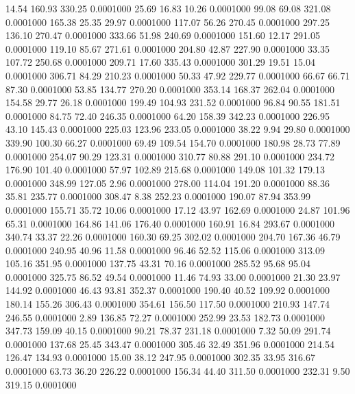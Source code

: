   14.54  160.93  330.25   0.0001000
  25.69   16.83   10.26   0.0001000
  99.08   69.08  321.08   0.0001000
 165.38   25.35   29.97   0.0001000
 117.07   56.26  270.45   0.0001000
 297.25  136.10  270.47   0.0001000
 333.66   51.98  240.69   0.0001000
 151.60   12.17  291.05   0.0001000
 119.10   85.67  271.61   0.0001000
 204.80   42.87  227.90   0.0001000
  33.35  107.72  250.68   0.0001000
 209.71   17.60  335.43   0.0001000
 301.29   19.51   15.04   0.0001000
 306.71   84.29  210.23   0.0001000
  50.33   47.92  229.77   0.0001000
  66.67   66.71   87.30   0.0001000
  53.85  134.77  270.20   0.0001000
 353.14  168.37  262.04   0.0001000
 154.58   29.77   26.18   0.0001000
 199.49  104.93  231.52   0.0001000
  96.84   90.55  181.51   0.0001000
  84.75   72.40  246.35   0.0001000
  64.20  158.39  342.23   0.0001000
 226.95   43.10  145.43   0.0001000
 225.03  123.96  233.05   0.0001000
  38.22    9.94   29.80   0.0001000
 339.90  100.30   66.27   0.0001000
  69.49  109.54  154.70   0.0001000
 180.98   28.73   77.89   0.0001000
 254.07   90.29  123.31   0.0001000
 310.77   80.88  291.10   0.0001000
 234.72  176.90  101.40   0.0001000
  57.97  102.89  215.68   0.0001000
 149.08  101.32  179.13   0.0001000
 348.99  127.05    2.96   0.0001000
 278.00  114.04  191.20   0.0001000
  88.36   35.81  235.77   0.0001000
 308.47    8.38  252.23   0.0001000
 190.07   87.94  353.99   0.0001000
 155.71   35.72   10.06   0.0001000
  17.12   43.97  162.69   0.0001000
  24.87  101.96   65.31   0.0001000
 164.86  141.06  176.40   0.0001000
 160.91   16.84  293.67   0.0001000
 340.74   33.37   22.26   0.0001000
 160.30   69.25  302.02   0.0001000
 204.70  167.36   46.79   0.0001000
 240.95   40.96   11.58   0.0001000
  96.46   52.52  115.06   0.0001000
 313.09  105.16  351.95   0.0001000
 137.75   43.31   70.16   0.0001000
 285.52   95.68   95.04   0.0001000
 325.75   86.52   49.54   0.0001000
  11.46   74.93   33.00   0.0001000
  21.30   23.97  144.92   0.0001000
  46.43   93.81  352.37   0.0001000
 190.40   40.52  109.92   0.0001000
 180.14  155.26  306.43   0.0001000
 354.61  156.50  117.50   0.0001000
 210.93  147.74  246.55   0.0001000
   2.89  136.85   72.27   0.0001000
 252.99   23.53  182.73   0.0001000
 347.73  159.09   40.15   0.0001000
  90.21   78.37  231.18   0.0001000
   7.32   50.09  291.74   0.0001000
 137.68   25.45  343.47   0.0001000
 305.46   32.49  351.96   0.0001000
 214.54  126.47  134.93   0.0001000
  15.00   38.12  247.95   0.0001000
 302.35   33.95  316.67   0.0001000
  63.73   36.20  226.22   0.0001000
 156.34   44.40  311.50   0.0001000
 232.31    9.50  319.15   0.0001000
